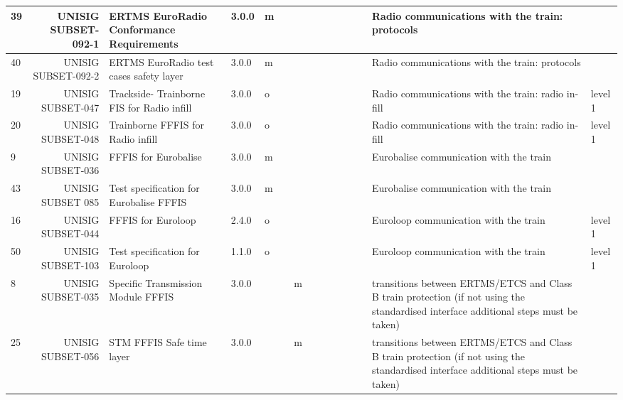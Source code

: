 \begin{tabular}{
p{0.4cm}|
r
p{8.5cm}|
p{1.0cm}|
p{0.5cm}|
p{0.3cm}|
p{0.3cm}|
p{0.3cm}|
p{0.3cm}|
p{0.3cm}|
p{0.3cm}|
p{0.3cm}|
p{0.3cm}|
p{12.0cm}|
p{1.0cm}}
39    & UNISIG SUBSET-092-1 & ERTMS EuroRadio Conformance Requirements & 3.0.0 & m     &       &       &       &       &       &       &       &       & Radio communications with the train: protocols &  \\\hline
40    & UNISIG SUBSET-092-2 & ERTMS EuroRadio test cases safety layer & 3.0.0 & m     &       &       &       &       &       &       &       &       & Radio communications with the train: protocols &  \\\hline
19    & UNISIG SUBSET-047 & Trackside- Trainborne FIS for Radio infill & 3.0.0 & o     &       &       &       &       &       &       &       &       & Radio communications with the train: radio in-fill & level 1 \\\hline
20    & UNISIG SUBSET-048 & Trainborne FFFIS
for Radio infill & 3.0.0 & o     &       &       &       &       &       &       &       &       & Radio communications with the train: radio in-fill & level 1 \\\hline
9     & UNISIG SUBSET-036 & FFFIS for
Eurobalise & 3.0.0 & m     &       &       &       &       &       &       &       &       & Eurobalise communication with the train &  \\\hline
43    & UNISIG SUBSET 085 & Test specification for Eurobalise FFFIS & 3.0.0 & m     &       &       &       &       &       &       &       &       & Eurobalise communication with the train &  \\\hline
16    & UNISIG SUBSET-044 & FFFIS for Euroloop & 2.4.0 & o     &       &       &       &       &       &       &       &       & Euroloop communication with the train & level 1 \\\hline
50    & UNISIG SUBSET-103 & Test specification for Euroloop & 1.1.0 & o     &       &       &       &       &       &       &       &       & Euroloop communication with the train & level 1 \\\hline
8     & UNISIG SUBSET-035 & Specific Transmission Module FFFIS & 3.0.0 &       &       & m     &       &       &       &       &       &       & transitions between ERTMS/ETCS and Class B train protection (if not using the standardised interface additional steps must be taken) &  \\\hline
25    & UNISIG SUBSET-056 & STM  FFFIS Safe time layer & 3.0.0 &       &       & m     &       &       &       &       &       &       & transitions between ERTMS/ETCS and Class B train protection (if not using the standardised interface additional steps must be taken) &  \\\hline

\end{tabular}
